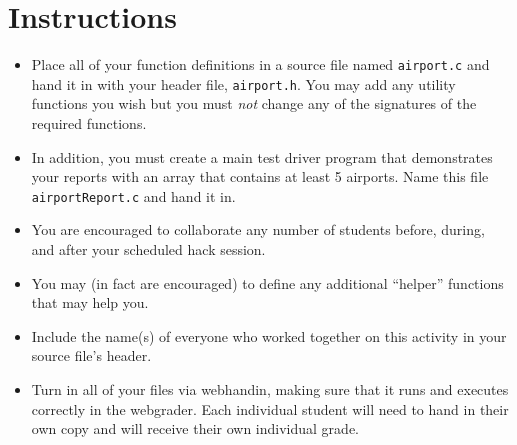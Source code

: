 \documentclass[12pt]{scrartcl}
\begin{document}
\section*{Instructions}

\begin{itemize}

  \item Place all of your function definitions in a source file named 
  \texttt{airport.c} and hand it in with your header file, 
  \texttt{airport.h}.  You may add any utility functions you
  wish but you must \emph{not} change any of the signatures of the required
  functions.
  
  \item In addition, you must create a main test driver program that 
  demonstrates your reports with an array that contains at least 5 
  airports. Name this file 
  \texttt{airportReport.c} and hand it in.

  \item You are encouraged to collaborate any number of students 
  before, during, and after your scheduled hack session.  

  \item You may (in fact are encouraged) to define any additional
  ``helper'' functions that may help you.

  \item Include the name(s) of everyone who worked together on
  this activity in your source file's header.

  \item Turn in all of your files via webhandin, making sure that 
  it runs and executes correctly in the webgrader.  Each individual 
  student will need to hand in their own copy and will receive 
  their own individual grade.
\end{itemize}  
\end{document}
